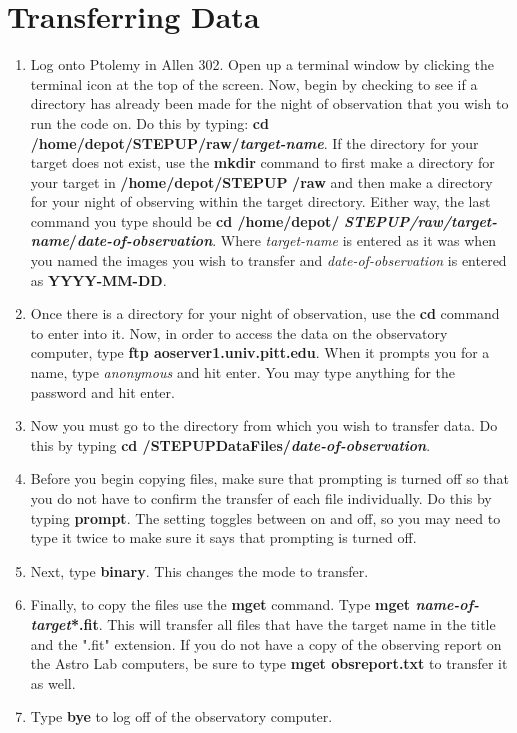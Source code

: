 \documentclass[11pt]{report}
\begin{document}
\section{Transferring Data}

\begin{enumerate}
\item Log onto Ptolemy in Allen 302. Open up a terminal window by clicking the terminal icon at the top of the screen. Now, begin by checking to see if a directory has already been made for the night of observation that you wish to run the code on. Do this by typing: {\bf cd /home/depot/STEPUP/raw/\emph{target-name}}. If the directory for your target does not exist, use the {\bf mkdir} command to first make a directory for your target in {\bf /home/depot/STEPUP} {\bf /raw} and then make a directory for your night of observing within the target directory. Either way, the last command you type should be {\bf cd /home/depot/} {\bf \emph{STEPUP/raw/target-name}/\emph{date-of-observation}}. Where \emph{target-name} is entered as it was when you named the images you wish to transfer and \emph{date-of-observation} is entered as {\bf YYYY-MM-DD}.
\item Once there is a directory for your night of observation, use the {\bf cd} command to enter into it. Now, in order to access the data on the observatory computer, type {\bf ftp aoserver1.univ.pitt.edu}. When it prompts you for a name, type \emph{anonymous} and hit enter. You may type anything for the password and hit enter.
\item Now you must go to the directory from which you wish to transfer data. Do this by typing {\bf cd /STEPUPDataFiles/\emph{date-of-observation}}.
\item Before you begin copying files, make sure that prompting is turned off so that you do not have to confirm the transfer of each file individually. Do this by typing {\bf prompt}. The setting toggles between on and off, so you may need to type it twice to make sure it says that prompting is turned off.
\item Next, type {\bf binary}. This changes the mode to transfer.
\item Finally, to copy the files use the {\bf mget} command. Type {\bf mget \emph{name-of-target}*.fit}. This will transfer all files that have the target name in the title and the ".fit" extension. If you do not have a copy of the observing report on the Astro Lab computers, be sure to type {\bf mget obsreport.txt} to transfer it as well. 
\item Type {\bf bye} to log off of the observatory computer.
\end{enumerate}
\end{document}
